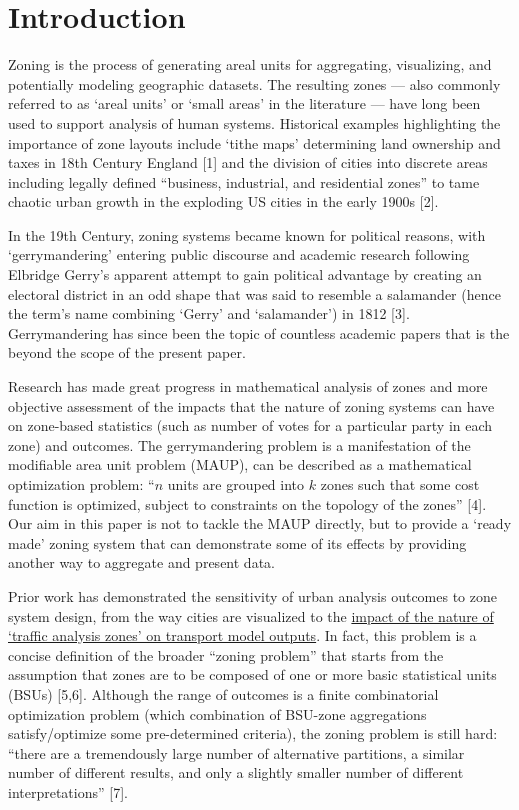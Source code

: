 \documentclass{josis}
\begin{document}
\hypertarget{introduction}{%
\section{Introduction}\label{introduction}}

Zoning is the process of generating areal units for aggregating, visualizing, and potentially modeling geographic datasets.
The resulting zones --- also commonly referred to as `areal units' or `small areas' in the literature --- have long been used to support analysis of human systems.
Historical examples highlighting the importance of zone layouts include `tithe maps' determining land ownership and taxes in 18th Century England {[}1{]} and the division of cities into discrete areas including legally defined ``business, industrial, and residential zones'' to tame chaotic urban growth in the exploding US cities in the early 1900s {[}2{]}.

In the 19th Century, zoning systems became known for political reasons, with `gerrymandering' entering public discourse and academic research following Elbridge Gerry's apparent attempt to gain political advantage by creating an electoral district in an odd shape that was said to resemble a salamander (hence the term's name combining `Gerry' and `salamander') in 1812 {[}3{]}.
Gerrymandering has since been the topic of countless academic papers that is the beyond the scope of the present paper.

Research has made great progress in mathematical analysis of zones and more objective assessment of the impacts that the nature of zoning systems can have on zone-based statistics (such as number of votes for a particular party in each zone) and outcomes.
The gerrymandering problem is a manifestation of the modifiable area unit problem (MAUP), can be described as a mathematical optimization problem: ``\(n\) units are grouped into \(k\) zones such that some cost function is optimized, subject to constraints on the topology of the zones'' {[}4{]}.
Our aim in this paper is not to tackle the MAUP directly, but to provide a `ready made' zoning system that can demonstrate some of its effects by providing another way to aggregate and present data.

Prior work has demonstrated the sensitivity of urban analysis outcomes to zone system design, from the way cities are visualized to the \href{http://www.iasi.cnr.it/ewgt/13conference/145_binetti.pdf}{impact of the nature of `traffic analysis zones' on transport model outputs}.
In fact, this problem is a concise definition of the broader ``zoning problem'' that starts from the assumption that zones are to be composed of one or more basic statistical units (BSUs) {[}5,6{]}.
Although the range of outcomes is a finite combinatorial optimization problem (which combination of BSU-zone aggregations satisfy/optimize some pre-determined criteria), the zoning problem is still hard: ``there are a tremendously large number of alternative partitions, a similar number of different results, and only a slightly smaller number of different interpretations'' {[}7{]}.
\end{document}
